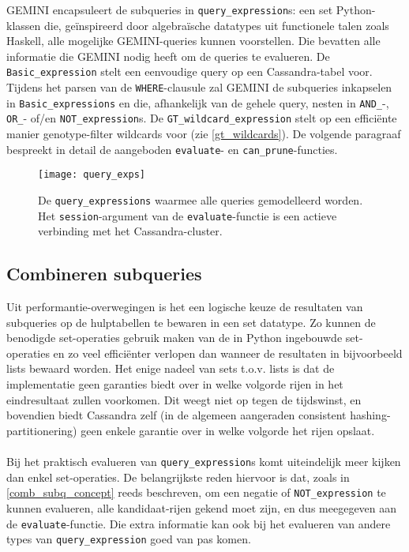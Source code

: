 GEMINI encapsuleert de subqueries in \texttt{query\_expression}s: een set Python-klassen die, ge\"inspireerd door algebra\"ische datatypes uit functionele talen zoals Haskell, alle mogelijke GEMINI-queries kunnen voorstellen. Die bevatten alle informatie die GEMINI nodig heeft om de queries te evalueren. De \texttt{Basic\_expression} stelt een eenvoudige query op een Cassandra-tabel voor. Tijdens het parsen van de \texttt{WHERE}-clausule zal GEMINI de subqueries inkapselen in \texttt{Basic\_expressions} en die, afhankelijk van de gehele query, nesten in \texttt{AND\_}-, \texttt{OR\_}- of/en \texttt{NOT\_expression}s. De \texttt{GT\_wildcard\_expression} stelt op een effici\"ente manier genotype-filter wildcards voor (zie \ref{gt_wildcards}). De volgende paragraaf bespreekt in detail de aangeboden \texttt{evaluate}- en \texttt{can\_prune}-functies.

\begin{figure}[h]
\texttt{[image: query\_exps]}
\caption{De \texttt{query\_expressions} waarmee alle queries gemodelleerd worden. Het \texttt{session}-argument van de \texttt{evaluate}-functie is een actieve verbinding met het Cassandra-cluster.}
\label{query_exps_diagram}
\end{figure}

\subsection{Combineren subqueries}

Uit performantie-overwegingen is het een logische keuze de resultaten van subqueries op de hulptabellen te bewaren in een set datatype. Zo kunnen de benodigde set-operaties gebruik maken van de in Python ingebouwde set-operaties en zo veel effici\"enter verlopen dan wanneer de resultaten in bijvoorbeeld lists bewaard worden. Het enige nadeel van sets t.o.v. lists is dat de implementatie geen garanties biedt over in welke volgorde rijen in het eindresultaat zullen voorkomen. Dit weegt niet op tegen de tijdswinst, en bovendien biedt Cassandra zelf (in de algemeen aangeraden consistent hashing-partitionering) geen enkele garantie over in welke volgorde het rijen opslaat.\\\\
Bij het praktisch evalueren van \texttt{query\_expression}s komt uiteindelijk meer kijken dan enkel set-operaties. De belangrijkste reden hiervoor is dat, zoals in \ref{comb_subq_concept} reeds beschreven, om een negatie of \texttt{NOT\_expression} te kunnen evalueren, alle kandidaat-rijen gekend moet zijn, en dus meegegeven aan de \texttt{evaluate}-functie. Die extra informatie kan ook bij het evalueren van andere types van \texttt{query\_expression} goed van pas komen.
 
